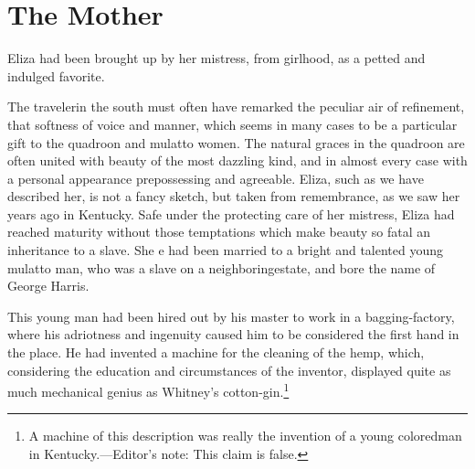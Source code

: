 \chapter{The Mother}

Eliza had been brought up by her mistress, from girlhood, as a petted and
indulged favorite\msc.

The traveler\msc in the south must often have remarked the peculiar air of
refinement, that softness of voice and manner, which seems in many cases to be
a particular gift to the quadroon and mulatto women. The natural graces in the
quadroon are often united with beauty of the most dazzling kind, and in almost
every case with a personal appearance prepossessing and agreeable. Eliza, such
as we have described her, is not a fancy sketch, but taken from remembrance\msc,
as we saw her years ago in Kentucky. Safe under the protecting care of her
mistress, Eliza had reached maturity without those temptations which make beauty
so fatal an inheritance to a slave.  She e had been married to a bright and
talented young mulatto man, who was a slave on a neighboring\msc estate, and
bore the name of George Harris.

This young man had been hired out by his master to work in a bagging-factory,
where his adriotness and ingenuity caused him to be considered the first hand in
the place. He had invented a machine for the cleaning of the hemp, which,
considering the education and circumstances of the inventor, displayed quite as
much mechanical genius as Whitney's cotton-gin.\footnote{A machine of this
description was really the invention of a young colored\msc man in
Kentucky.---Editor's note: This claim is false.}


